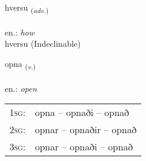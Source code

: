 \documentclass[frontgrid, backgrid]{flacards}\usepackage[]{graphicx}\usepackage[]{xcolor}
\begin{document}

\renewcommand{\flhead}{\vskip5pt \fboxsep=0pt {\small\bfseries\footnotesize Atviksorð | Adverb}}
\renewcommand{\fcfoot}{\vskip5pt \fboxsep=0pt \hspace{2pt}{\small\bfseries\footnotesize 1K}}

\renewcommand{\blhead}{\vskip5pt {\small\bfseries\footnotesize Atviksorð | Adverb }}
\renewcommand{\bcfoot}{\vskip5pt \hspace{2pt}{\small\bfseries\footnotesize 1K}}


{hversu \small{\textsubscript{(\textit{adv.})}} \\[1ex]
\textphonetic{[kʰvɛr̥sʏ]} \\
en.: \emph{how} \\  [2ex]
hversu (Indeclinable)}

\renewcommand{\flhead}{\vskip5pt \fboxsep=0pt {\small\bfseries\footnotesize Sagnorð | Verb}}
\renewcommand{\fcfoot}{\vskip5pt \fboxsep=0pt \hspace{2pt}{\small\bfseries\footnotesize 1K}}

\renewcommand{\blhead}{\vskip5pt {\small\bfseries\footnotesize Sagnorð | Verb }}
\renewcommand{\bcfoot}{\vskip5pt \hspace{2pt}{\small\bfseries\footnotesize 1K}}


{opna \small{\textsubscript{(\textit{v.})}} \\[1ex] %
\textphonetic{[ɔhpna]} \\
en.: \emph{open} \\  [2ex]
\renewcommand*{\arraystretch}{0.8}
\begin{tabular}{p{1cm}l}
\textsc{1sg}: & opna -- opnaði -- opnað \\ 
\textsc{2sg}: & opnar -- opnaðir -- opnað \\ 
\textsc{3sg}: & opnar -- opnaði -- opnað \\ 
\end{tabular}
}

\renewcommand{\flhead}{\vskip5pt \fboxsep=0pt {\small\bfseries\footnotesize Sagnorð | Verb}}
\renewcommand{\fcfoot}{\vskip5pt \fboxsep=0pt \hspace{2pt}{\small\bfseries\footnotesize 1K}}
\end{document}
